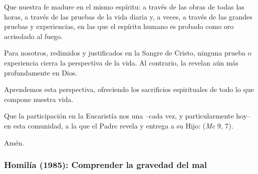 \begin{body}
Que nuestra fe madure en el mismo espíritu: a través de las obras de todas las horas, a través de las pruebas de la vida diaria y, a veces, a través de las grandes pruebas y experiencias, en las que el espíritu humano es probado como oro acrisolado al fuego.

Para nosotros, redimidos y justificados en la Sangre de Cristo, ninguna prueba o experiencia cierra la perspectiva de la vida. Al contrario, la revelan aún más profundamente en Dios.

Aprendemos esta perspectiva, ofreciendo los sacrificios espirituales de todo lo que compone nuestra vida.

Que la participación en la Eucaristía nos una –cada vez, y particularmente hoy– en esta comunidad, a la que el Padre revela y entrega a su Hijo:  (\textit{Mc} 9, 7).

Amén.
\end{body}


\label{b2-03-02-1982H}
\newpage 


\subsubsection{Homilía (1985): Comprender la gravedad del mal}


